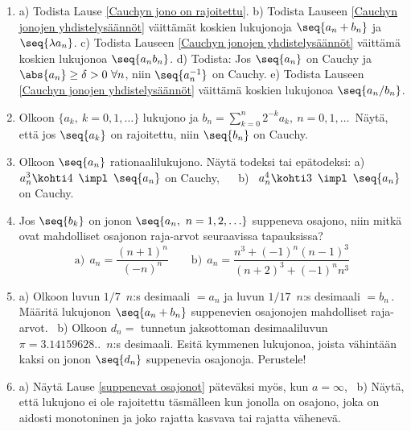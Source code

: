 \Harj
\begin{enumerate}

\item \label{H-I-9: todistuksia}
a) Todista Lause \ref{Cauchyn jono on rajoitettu}. \newline
b) Todista Lauseen \ref{Cauchyn jonojen yhdistelysäännöt} väittämät koskien lukujonoja
$\seq{a_n+b_n}$ ja $\seq{\lambda a_n}$. \newline
c) Todista Lauseen \ref{Cauchyn jonojen yhdistelysäännöt} väittämä koskien lukujonoa
$\seq{a_n b_n}$. \newline
d) Todista: Jos $\seq{a_n}$ on Cauchy ja $\abs{a_n} \ge \delta>0\ \forall n$, niin 
$\seq{a_n^{-1}}$ on Cauchy. \newline
e) Todista Lauseen \ref{Cauchyn jonojen yhdistelysäännöt} väittämä koskien lukujonoa
$\seq{a_n/b_n}$.

\item
Olkoon $\{a_k,\ k=0,1,\ldots\}$ lukujono ja $b_n=\sum_{k=0}^n 2^{-k}a_k,\ n=0,1,\ldots\,$
Näytä, että jos $\seq{a_k}$ on rajoitettu, niin $\seq{b_n}$ on Cauchy.

\item
Olkoon $\seq{a_n}$ rationaalilukujono. Näytä todeksi tai epätodeksi: \newline
a) \ $a_n^3 \kohti 4\,\ \impl\,\ \seq{a_n}$ on Cauchy, $\quad$
b) \ $a_n^4 \kohti 3\,\ \impl\,\ \seq{a_n}$ on Cauchy.

\item
Jos $\seq{b_k}$ on jonon $\seq{a_n,\ n=1,2, \ldots}$ suppeneva osajono, niin mitkä ovat
mahdolliset osajonon raja-arvot seuraavissa tapauksissa?
\[
\text{a)}\ \ a_n = \frac{(n+1)^n}{(-n)^n} \qquad 
\text{b)}\ \ a_n = \frac{n^3+(-1)^n(n-1)^3}{(n+2)^3+(-1)^n n^3}
\]

\item
a) Olkoon luvun $1/7\,$ $n$:s desimaali $=a_n$ ja luvun $1/17\,$ $n$:s desimaali $=b_n\,$.
Määritä lukujonon $\seq{a_n+b_n}$ suppenevien osajonojen mahdolliset raja-arvot. \
b) Olkoon $d_n =$ tunnetun jaksottoman desimaaliluvun $\pi=3.14159628..\,$ $n$:s desimaali.
Esitä kymmenen lukujonoa, joista vähintään kaksi on jonon $\seq{d_n}$ suppenevia osajonoja.
Perustele!

\item \label{H-I-9: suppenevat osajonot}
a) Näytä Lause \ref{suppenevat osajonot} päteväksi myös, kun $a=\infty$, \ b) Näytä, että
lukujono ei ole rajoitettu täsmälleen kun jonolla on osajono, joka on aidosti monotoninen ja
joko rajatta kasvava tai rajatta vähenevä.


\end{enumerate}
